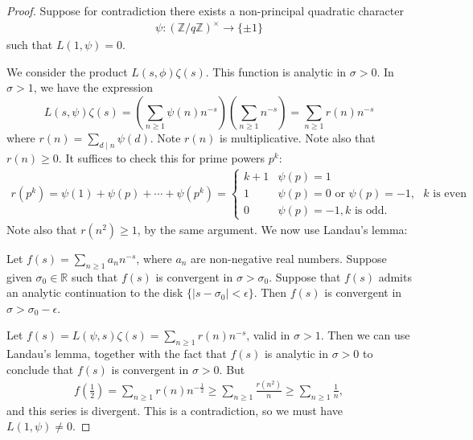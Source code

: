 \documentclass{article}
\newcommand{\1}{\mathbbm{1}}
\begin{document}
\begin{proof}
  Suppose for contradiction there exists a non-principal quadratic character
  \begin{align*}
    \psi: (\mathbb{Z}/q\mathbb{Z})^\times \to \{\pm 1\}
  \end{align*}
  such that $L(1,\psi) = 0$.

  We consider the product $L(s,\phi) \zeta(s)$. This function is analytic in $\sigma > 0$.
  In $\sigma > 1$, we have the expression
  \begin{equation}
    L(s,\psi) \zeta(s) = \left( \sum_{n \geq1} \psi(n) n^{-s} \right) (\sum_{n \geq 1} n^{-s}) = \sum_{n \geq 1} r(n) n^{-s}
  \end{equation}
  where $r(n) = \sum_{d \mid n} \psi(d)$. Note $r(n)$ is multiplicative.
  Note also that $r(n) \geq 0$. It suffices to check this for prime powers $p^k$:
  \begin{align*}
    r(p^k) = \psi(1) + \psi(p) + \dotsb + \psi(p^k) =
    \begin{cases}
      k+1 & \psi(p) = 1 \\
      1 & \psi(p) = 0 \text{ or } \psi(p) = -1, \text{ $k$ is even} \\
      0 & \psi(p) = -1, k\text{ is odd.}
    \end{cases}
  \end{align*}
  Note also that $r(n^2) \geq 1$, by the same argument.
  We now use Landau's lemma:
  \begin{lemma}
    Let $f(s) = \sum_{n \geq 1} a_n n^{-s}$, where $a_n$ are non-negative real numbers.
    Suppose given $\sigma_0 \in \mathbb{R}$ such that $f(s)$ is convergent in $\sigma > \sigma_0$.
    Suppose that $f(s)$ admits an analytic continuation to the disk $\{|s-\sigma_0| < \epsilon\}$.
    Then $f(s)$ is convergent in $\sigma > \sigma_0 -\epsilon$.
  \end{lemma}
  \begin{center}
  \begin{tikzpicture}

  \end{tikzpicture}
  \end{center}
  Let $f(s) = L(\psi,s) \zeta(s) = \sum_{n \geq 1} r(n) n^{-s}$, valid in $\sigma > 1$.
  Then we can use Landau's lemma, together with the fact that $f(s)$ is analytic in $\sigma > 0$ to conclude that $f(s)$ is convergent in $\sigma > 0$.
  But
  \begin{align*}
    f(\frac 12) = \sum_{n \geq 1} r(n) n^{-\frac 12} \geq \sum_{n \geq 1} \frac{r(n^2)}{n} \geq \sum_{n \geq 1} \frac{1}{n},
  \end{align*}
  and this series is divergent.
  This is a contradiction, so we must have $L(1,\psi) \neq 0$.
\end{proof}
\end{document}
